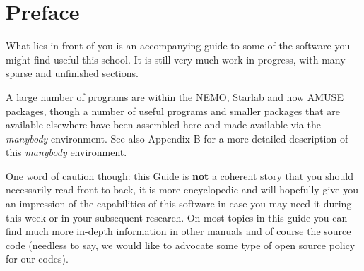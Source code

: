 {{%
\pagestyle{empty}

\newpage

\pagestyle{headings}
\tableofcontents
{}
\listoftables
{}
\listoffigures
{}

\chapter*{Preface}

What lies in front of you is an accompanying guide to some of 
the software you might find useful this school.
It is still very much work in progress, with many sparse and
unfinished sections.


A large number of programs are within the NEMO, Starlab and now
AMUSE packages, 
though a number of useful programs and smaller packages
that are available elsewhere have been assembled here
and made available via the {\it manybody} environment.
See also Appendix B for a more detailed description of this
{\it manybody} environment.

One word of caution though: this Guide is {\bf not} a coherent
story that you should necessarily read front to back, it is more encyclopedic
and will hopefully give you an impression of the capabilities
of this software in case you may need it during this week or in
your subsequent research. On most topics in this guide you can find
much more in-depth information in other manuals and of course 
the source code (needless to say, we would like to advocate some
type of open source policy for our codes).

%

}}
